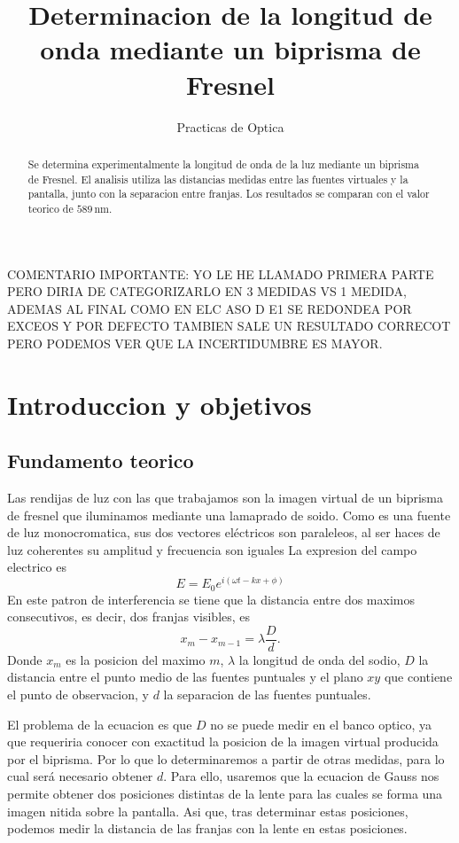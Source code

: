 \documentclass[a4paper,11pt]{article}
\begin{document}
\title{Determinacion de la longitud de onda mediante un biprisma de Fresnel}
\author{Practicas de Optica}
\maketitle

\begin{abstract}
Se determina experimentalmente la longitud de onda de la luz mediante un biprisma
de Fresnel. El analisis utiliza las distancias medidas entre las fuentes virtuales
y la pantalla, junto con la separacion entre franjas. Los resultados se comparan
con el valor teorico de $589\,\mathrm{nm}$.
\end{abstract}
COMENTARIO IMPORTANTE: YO LE HE LLAMADO PRIMERA PARTE PERO DIRIA DE CATEGORIZARLO EN 3 MEDIDAS VS 1 MEDIDA, ADEMAS AL FINAL COMO EN ELC ASO D E1 SE REDONDEA POR EXCEOS Y POR DEFECTO TAMBIEN SALE UN RESULTADO CORRECOT PERO PODEMOS VER QUE 
LA INCERTIDUMBRE ES MAYOR.
\section{Introduccion y objetivos}

\subsection{Fundamento teorico}
Las rendijas de luz con las que trabajamos son la imagen virtual de un biprisma de fresnel que iluminamos mediante una lamaprado de soido.
Como es una fuente de luz monocromatica, sus dos vectores eléctricos son paraleleos, al ser haces de luz coherentes su amplitud y frecuencia son iguales
La expresion del campo electrico es
\begin{equation}
E = E_0 e^{i(\omega t - k x + \phi)}
\end{equation}
En este patron de interferencia se tiene que la distancia entre dos maximos consecutivos,
es decir, dos franjas visibles, es
\begin{equation}
x_m-x_{m-1}=\lambda\frac{D}{d}.
\end{equation}
Donde $x_m$ es la posicion del maximo $m$, $\lambda$ la longitud de onda del sodio,
$D$ la distancia entre el punto medio de las fuentes puntuales y el plano $xy$ que
contiene el punto de observacion, y $d$ la separacion de las fuentes puntuales.

El problema de la ecuacion es que $D$ no se puede medir en el banco optico, ya que
requeriria conocer con exactitud la posicion de la imagen virtual producida por el
biprisma. Por lo que lo determinaremos a partir de otras medidas, para lo cual será necesario obtener $d$. 
Para ello, usaremos que la ecuacion de Gauss nos permite obtener dos
posiciones distintas de la lente para las cuales se forma una imagen nitida sobre
la pantalla. Asi que, tras determinar estas posiciones, podemos medir la distancia
de las franjas con la lente en estas posiciones.
\end{document}
